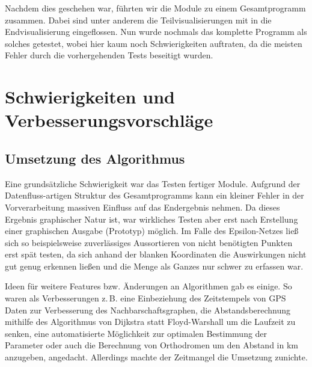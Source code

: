 \documentclass[parskip=half,
 fontsize=12pt, bibtotoc,
 ngerman]
 {article}
\begin{document}
Nachdem dies geschehen war, führten wir die Module zu einem Gesamtprogramm zusammen. Dabei sind unter anderem die Teilvisualisierungen mit in die Endvisualisierung eingeflossen. Nun wurde nochmals das komplette Programm als solches getestet, wobei hier kaum noch Schwierigkeiten auftraten, da die meisten Fehler durch die vorhergehenden Tests beseitigt wurden.

\section{Schwierigkeiten und Verbesserungsvorschläge}

\subsection*{Umsetzung des Algorithmus}
Eine grundsätzliche Schwierigkeit war das Testen fertiger Module.
Aufgrund der Datenfluss-artigen Struktur des Gesamtprogramms kann
ein kleiner Fehler in der Vorverarbeitung massiven Einfluss
auf das Endergebnis nehmen. Da dieses Ergebnis graphischer Natur ist,
war wirkliches Testen aber erst nach Erstellung einer graphischen Ausgabe
(Prototyp) möglich. Im Falle des Epsilon-Netzes ließ sich so beispielsweise 
zuverlässiges Aussortieren von nicht benötigten Punkten erst spät testen,
da sich anhand der blanken Koordinaten die Auswirkungen nicht gut genug
erkennen ließen und die Menge als Ganzes nur schwer zu erfassen war.

Ideen für weitere Features bzw. Änderungen an Algorithmen gab es einige. So waren
als Verbesserungen z.\,B. eine Einbeziehung des Zeitstempels von GPS Daten
zur Verbesserung des Nachbarschaftsgraphen, die Abstandsberechnung mithilfe des
Algorithmus von Dijkstra statt Floyd-Warshall um die Laufzeit zu senken,
eine automatisierte Möglichkeit zur optimalen Bestimmung der Parameter oder
auch die Berechnung von Orthodromen um den Abstand in km anzugeben, angedacht. Allerdings machte der Zeitmangel die Umsetzung zunichte.
\end{document}
